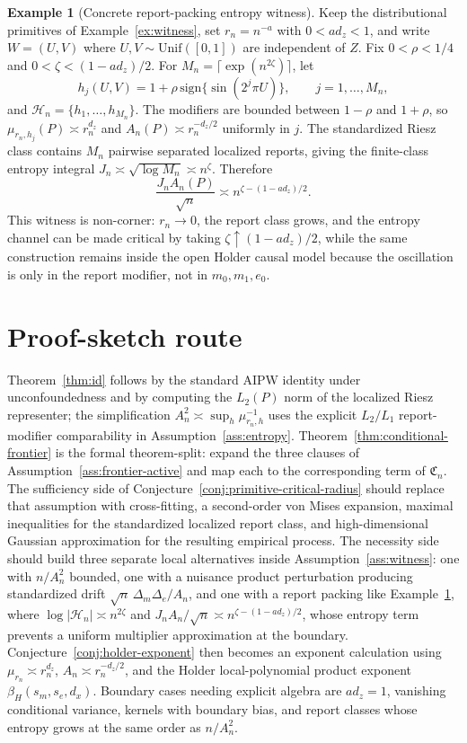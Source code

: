 \documentclass[11pt]{article}
\newcommand{\calH}{\mathcal{H}}
\theoremstyle{definition}
\newtheorem{example}{Example}
\theoremstyle{plain}
\theoremstyle{remark}
\begin{document}
\begin{example}[Concrete report-packing entropy witness]\label{ex:report-packing}
Keep the distributional primitives of Example~\ref{ex:witness}, set
\(r_n=n^{-a}\) with \(0<a d_z<1\), and write \(W=(U,V)\) where
\(U,V\sim\mathrm{Unif}([0,1])\) are independent of \(Z\).  Fix
\(0<\rho<1/4\) and \(0<\zeta<(1-a d_z)/2\).  For
\(M_n=\lceil\exp(n^{2\zeta})\rceil\), let
\[
h_j(U,V)=1+\rho\,\mathrm{sign}\{\sin(2^j\pi U)\},\qquad
j=1,\ldots,M_n,
\]
and \(\calH_n=\{h_1,\ldots,h_{M_n}\}\).  The modifiers are bounded between
\(1-\rho\) and \(1+\rho\), so
\(\mu_{r_n,h_j}(P)\asymp r_n^{d_z}\) and
\(A_n(P)\asymp r_n^{-d_z/2}\) uniformly in \(j\).  The standardized Riesz
class contains \(M_n\) pairwise separated localized reports, giving the
finite-class entropy integral \(J_n\asymp\sqrt{\log M_n}\asymp n^\zeta\).
Therefore
\[
\frac{J_nA_n(P)}{\sqrt n}\asymp n^{\zeta-(1-a d_z)/2}.
\]
This witness is non-corner: \(r_n\to0\), the report class grows, and the
entropy channel can be made critical by taking
\(\zeta\uparrow(1-a d_z)/2\), while the same construction remains inside the
open Holder causal model because the oscillation is only in the report
modifier, not in \(m_0,m_1,e_0\).
\end{example}

\section{Proof-sketch route}
Theorem~\ref{thm:id} follows by the standard AIPW identity under
unconfoundedness and by computing the \(L_2(P)\) norm of the localized Riesz
representer; the simplification \(A_n^2\asymp\sup_h\mu_{r_n,h}^{-1}\) uses
the explicit \(L_2/L_1\) report-modifier comparability in
Assumption~\ref{ass:entropy}.  Theorem~\ref{thm:conditional-frontier} is the
formal theorem-split: expand the three clauses of
Assumption~\ref{ass:frontier-active} and map each to the corresponding term of
\(\mathfrak C_n\).  The sufficiency side of
Conjecture~\ref{conj:primitive-critical-radius} should replace that assumption
with cross-fitting, a second-order von Mises expansion, maximal inequalities
for the standardized localized report class, and high-dimensional Gaussian
approximation for the resulting empirical process.  The necessity side should
build three separate local alternatives inside Assumption~\ref{ass:witness}:
one with \(n/A_n^2\) bounded, one with a nuisance product perturbation
producing standardized drift \(\sqrt n\,\Delta_m\Delta_e/A_n\), and one with a
report packing like Example~\ref{ex:report-packing}, where
\(\log|\calH_n|\asymp n^{2\zeta}\) and
\(J_nA_n/\sqrt n\asymp n^{\zeta-(1-a d_z)/2}\), whose entropy term prevents a
uniform multiplier approximation at the boundary.
Conjecture~\ref{conj:holder-exponent} then becomes an exponent calculation
using \(\mu_{r_n}\asymp r_n^{d_z}\), \(A_n\asymp r_n^{-d_z/2}\), and the
Holder local-polynomial product exponent \(\beta_H(s_m,s_e,d_x)\).
Boundary cases needing explicit algebra are \(a d_z=1\), vanishing conditional
variance, kernels with boundary bias, and report classes whose entropy grows
at the same order as \(n/A_n^2\).
\end{document}
